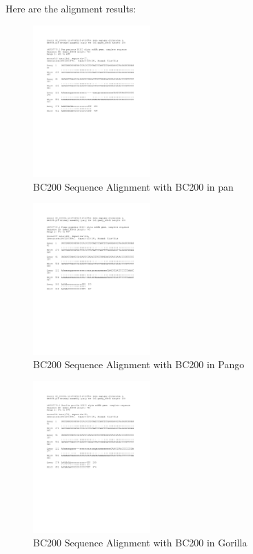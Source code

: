 \documentclass[conference]{IEEEtran}
\begin{document}
Here are the alignment results:
\begin{figure}
  \centering
  \includegraphics[width=0.4\textwidth]{figs/TK1PBYHT114-Alignment-2-page-1.png}
  \caption{BC200 Sequence Alignment with BC200 in pan}
\end{figure}
\begin{figure}
  \centering
  \includegraphics[width=0.4\textwidth]{figs/TK1PBYHT114-Alignment-3-page-1.png}
  \caption{BC200 Sequence Alignment with BC200 in Pango}
\end{figure}
\begin{figure}
  \centering
  \includegraphics[width=0.4\textwidth]{figs/TK1PBYHT114-Alignment-page-1.png}
  \caption{BC200 Sequence Alignment with BC200 in Gorilla}
\end{figure}
\end{document}
